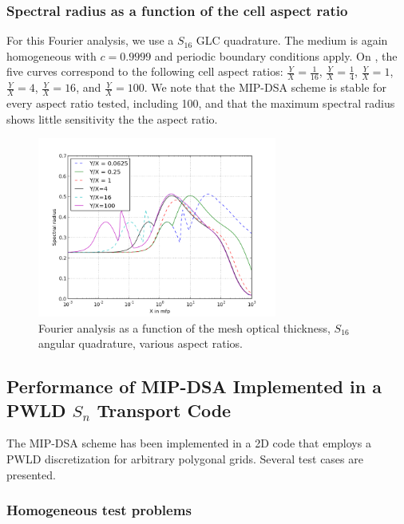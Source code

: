 \subsubsection{Spectral radius as a function of the cell aspect ratio}
For this Fourier analysis, we use a $S_{16}$ GLC quadrature. The medium is
again homogeneous with $c=0.9999$ and periodic boundary conditions apply. 
On , the five curves correspond to the following cell aspect 
ratios: $\frac{Y}{X}=\frac{1}{16}$, $\frac{Y}{X}=\frac{1}{4}$,
$\frac{Y}{X}=1$, $\frac{Y}{X}=4$, $\frac{Y}{X}=16$, and $\frac{Y}{X}=100$.
We note that the MIP-DSA scheme is stable for every aspect ratio tested, including 100, 
and that the maximum spectral radius shows little sensitivity the the aspect ratio.
\begin{figure}[!htbp]
  \centering
  \includegraphics[width=0.7\textwidth]{aspect_ratio_9999_2}
  \caption{Fourier analysis as a function of the mesh optical thickness,
  $S_{16}$ angular quadrature, various aspect ratios.}
  \label{fig_fa_ar}
\end{figure}

\subsection{Performance of MIP-DSA Implemented in a PWLD $S_n$ Transport Code}
The MIP-DSA scheme has been implemented in a 2D \sn code that employs a PWLD discretization
for arbitrary polygonal grids. Several test cases are presented.

\subsubsection{Homogeneous test problems}  \label{sec_homog}

